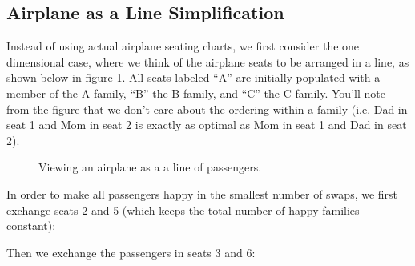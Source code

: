 \subsection{Airplane as a Line Simplification}

Instead of using actual airplane seating charts, we first consider the one dimensional case, where we think of the airplane seats to be arranged in a line, as shown below in figure \ref{fig:lineplane}.  All seats labeled ``A'' are initially populated with a member of the A family, ``B'' the B family, and ``C'' the C family.  You'll note from the figure that we don't care about the ordering within a family (i.e. Dad in seat 1 and Mom in seat 2 is exactly as optimal as Mom in seat 1 and Dad in seat 2). 

\begin{figure}[H]
\label{fig:lineplane}
\centering
{}
\caption{Viewing an airplane as a a line of passengers.}
\end{figure}

In order to make all passengers happy in the smallest number of swaps, we first exchange seats 2 and 5 (which keeps the total number of happy families constant):

\begin{figure}[H]
\centering
{}
\end{figure}

Then we exchange the passengers in seats 3 and 6:

